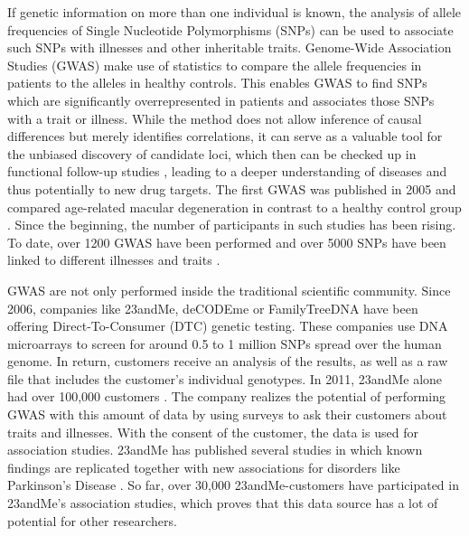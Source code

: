 \documentclass[10pt]{article}
\begin{document}
If genetic information on more than one individual is known, the analysis of
allele frequencies of Single Nucleotide Polymorphisms (SNPs) can be used to associate such SNPs with illnesses and other inheritable traits. Genome-Wide Association Studies
(GWAS) make use of statistics to compare the allele frequencies in patients to the alleles in healthy controls. This
enables GWAS to find SNPs which are significantly overrepresented in patients and associates those SNPs with a trait or illness.
While the method does not allow inference of causal differences but merely identifies correlations, it can serve as a valuable tool for the unbiased discovery of candidate loci, which then can be checked up in functional follow-up studies \cite{10.1371/journal.pgen.1002584}, leading to a deeper understanding of diseases and thus potentially to new drug targets.  
The first GWAS was published in 2005 and compared age-related macular degeneration in contrast 
to a healthy control group \cite{Klein2005}. Since the beginning, the number of participants in 
such studies has been rising. To date, over 1200 GWAS have been performed \cite{Johnson2009} and over 
5000 SNPs have been linked to different illnesses and traits \cite{Hindorff2009}.   

GWAS are not only performed inside the traditional scientific community. 
Since 2006, companies like 23andMe, deCODEme or FamilyTreeDNA have been offering Direct-To-Consumer (DTC) genetic testing. 
These companies use DNA microarrays to screen for around 0.5 to 1 million SNPs spread over the human genome. In return, customers 
receive an analysis of the results, as well as a raw file that includes the customer's individual genotypes. In 2011, 23andMe 
alone had over 100,000 customers \cite{23andMe2011}. The company realizes the potential of performing GWAS with this amount of data by using surveys to ask their customers about 
traits and illnesses. With the consent of the customer, the data is used for association studies. 23andMe has published several 
studies in which known findings are replicated together with new associations for disorders like Parkinson's Disease \cite{Eriksson2010, Do2011}. 
So far, over 30,000 23andMe-customers have participated in 23andMe's association studies, which proves that this data source has a lot of potential for other researchers.
\end{document}
